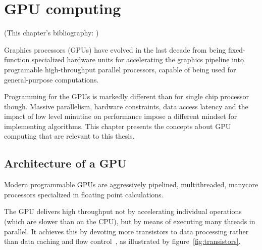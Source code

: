 \chapter{GPU computing}
\label{ch:gpu-computing}

(This chapter's bibliography:
\cite{cudaprog2} \cite{owens08} \cite{jansen07} \cite{lejdfors08}%
)

Graphics processors (GPUs) have evolved in the last decade
from being fixed-function specialized hardware units
for accelerating the graphics pipeline
into programable high-throughput parallel processors,
capable of being used for general-purpose computations.

Programming for the GPUs is markedly different
than for single chip processor though.
Massive parallelism,
hardware constraints,
data access latency and
the impact of low level minutiae on performance
impose a different mindset for implementing algorithms.
This chapter presents the concepts
about GPU computing that are relevant to this thesis.

\section{Architecture of a GPU}

Modern programmable GPUs are aggressively pipelined,
multithreaded, manycore processors
specialized in floating point calculations.

The GPU delivers high throughput not by accelerating individual operations
(which are slower than on the CPU),
but by means of executing many threads in parallel.
It achieves this by devoting more transistors to data processing
rather than data caching and flow control~\cite[\S1]{cudaprog2},
as illustrated by figure~\ref{fig:transistors}.

